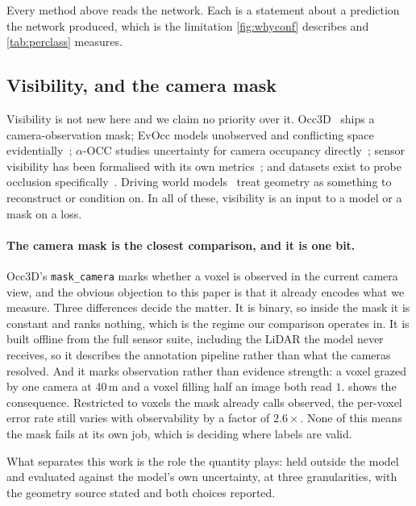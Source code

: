 \documentclass[10pt,twocolumn,letterpaper]{article}
\newcommand{\nMvoRatio}{$2.6\times$}
\begin{document}
Every method above reads the network. Each is a statement about a
prediction the network produced, which is the limitation
\cref{fig:whyconf} describes and \cref{tab:perclass} measures.

\subsection{Visibility, and the camera mask}
Visibility is not new here and we claim no priority over it.
Occ3D~\cite{tian2023occ3d} ships a camera-observation mask; EvOcc models
unobserved and conflicting space evidentially~\cite{kalble2025evocc};
$\alpha$-OCC studies uncertainty for camera occupancy
directly~\cite{occ2024alpha}; sensor visibility has
been formalised with its own metrics~\cite{borger2022sensorvisibility};
and datasets exist to probe occlusion
specifically~\cite{occludednuscenes2025}. Driving world
models~\cite{rahimi2026mad, xia2026drivelaw, zhu2026dlwm, tan2026lcdrive}
treat geometry as something to reconstruct or condition on. In all of
these, visibility is an input to a model or a mask on a loss.

\paragraph{The camera mask is the closest comparison, and it is one bit.}
Occ3D's \texttt{mask\_camera} marks whether a voxel is observed in the
current camera view, and the obvious objection to this paper is that it
already encodes what we measure. Three differences decide the matter. It
is binary, so inside the mask it is constant and ranks nothing, which is
the regime our comparison operates in. It is built offline from the full
sensor suite, including the LiDAR the model never receives, so it
describes the annotation pipeline rather than what the cameras resolved.
And it marks observation rather than evidence strength: a voxel grazed by
one camera at 40\,m and a voxel filling half an image both read $1$.
 shows the consequence. Restricted to voxels the mask
already calls observed, the per-voxel error rate still varies with
observability by a factor of \nMvoRatio. None of this means the mask fails
at its own job, which is deciding where labels are valid.

What separates this work is the role the quantity plays: held outside the
model and evaluated against the model's own uncertainty, at three
granularities, with the geometry source stated and both choices reported.
\end{document}
